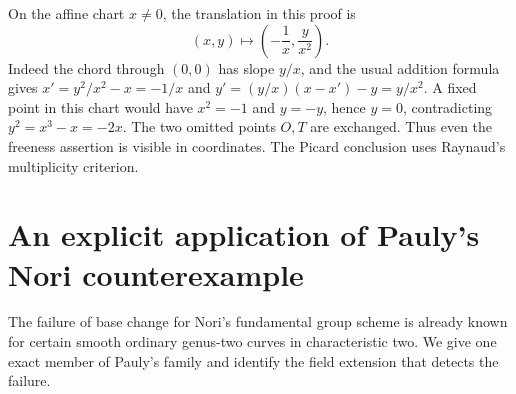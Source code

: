 \documentclass[11pt,a4paper]{article}
\theoremstyle{definition}
\begin{document}
On the affine chart $x\ne0$, the translation in this proof is
\[
 (x,y)\longmapsto\left(-\frac1x,\frac{y}{x^2}\right).
\]
Indeed the chord through $(0,0)$ has slope $y/x$, and the usual addition formula gives $x'=y^2/x^2-x=-1/x$ and $y'=(y/x)(x-x')-y=y/x^2$. A fixed point in this chart would have $x^2=-1$ and $y=-y$, hence $y=0$, contradicting $y^2=x^3-x=-2x$. The two omitted points $O,T$ are exchanged. Thus even the freeness assertion is visible in coordinates. The Picard conclusion uses Raynaud's multiplicity criterion.

\section{An explicit application of Pauly's Nori counterexample}
The failure of base change for Nori's fundamental group scheme is already known for certain smooth ordinary genus-two curves in characteristic two. We give one exact member of Pauly's family and identify the field extension that detects the failure.
\end{document}
